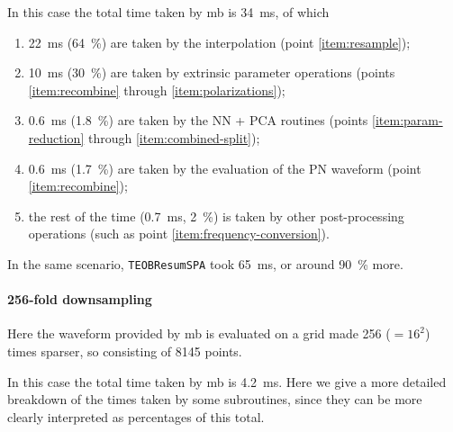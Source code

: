 \documentclass[main.tex]{subfiles}
\begin{document}
In this case the total time taken by \ac{mb} is \SI{34}{ms}, of which 
\begin{enumerate}
    \item \SI{22}{ms} (\SI{64}{\%}) are taken by the interpolation (point \ref{item:resample});
    \item \SI{10}{ms} (\SI{30}{\%}) are taken by extrinsic parameter operations (points \ref{item:recombine} through \ref{item:polarizations});
    \item \SI{0.6}{ms} (\SI{1.8}{\%}) are taken by the \ac{NN} + \ac{PCA} routines (points \ref{item:param-reduction} through \ref{item:combined-split});
    \item \SI{0.6}{ms} (\SI{1.7}{\%}) are taken by the evaluation of the \ac{PN} waveform (point \ref{item:recombine});
    \item the rest of the time (\SI{0.7}{ms}, \SI{2}{\%}) is taken by other post-processing operations (such as point \ref{item:frequency-conversion}).
\end{enumerate}

In the same scenario, \texttt{TEOBResumSPA} took \SI{65}{ms}, or around \SI{90}{\%} more. 

\paragraph{256-fold downsampling}

Here the waveform provided by \ac{mb} is evaluated on a grid made 256 (\( = 16^2\)) times sparser, so consisting of 8145 points.

In this case the total time taken by \ac{mb} is \SI{4.2}{ms}.
Here we give a more detailed breakdown of the times taken by some subroutines, since they can be more clearly interpreted as percentages of this total. 
\end{document}
